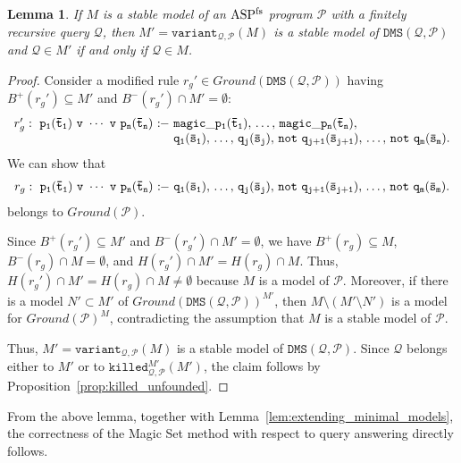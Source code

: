\documentclass{tlp}
\newcommand{\nop}[1]{}
\newcommand{\Or}{\ensuremath{\mathtt{\,v\,}}\xspace}
\newcommand{\derives}{\ensuremath{\mathtt{\ :\!\!-}\ }}
\newcommand{\p}{\ensuremath{{\mathcal{P}}}}
\newcommand{\R}{\ensuremath{r}}
\newcommand{\naf}{\ensuremath{\mathtt{not}}\xspace}
\newcommand{\ground}[1]{\ensuremath{Ground(#1)}}
\newcommand{\head}[1]{\ensuremath{H(#1)}}
\newcommand{\posbody}[1]{\ensuremath{B^+(#1)}}
\newcommand{\negbody}[1]{\ensuremath{B^-(#1)}}
\newenvironment{dlvcode}
  {\begin{displaymath}\begin{array}{l}}
  {\end{array}\end{displaymath}}
\newtheorem{lemma}[theorem]{Lemma}
\newcommand{\Q}{\mathcal{Q}}
\newcommand{\dmsqp}{\ensuremath{\DMS(\Q,\p)}}
\newcommand{\killed}[4]{\ensuremath{\mathtt{killed}^{#1}_{#3,#4}(#2)}}
\newcommand{\killedmpmp}{\ensuremath{\killed{M'}{M'}{\Q}{\p}}}
\newcommand{\variant}[3]{\ensuremath{\mathtt{variant}_{#1,#2}(#3)}}
\newcommand{\variantqpm}{\ensuremath{\variant{\Q}{\p}{M}}}
\newcommand{\DMS}{\ensuremath{\mathtt{DMS}}}
\renewcommand{\t}{\bar t}
\newcommand{\s}{\bar s}
\newcommand{\ASPFN}{\ensuremath{\rm ASP^{\rm fs}}}
\begin{document}
\begin{lemma}\label{lem:variant_stable_model} 
If $M$ is a stable model of an \ASPFN{} program $\p$ with a finitely recursive query $\Q$, then $M' = \variantqpm$ is a stable model of $\dmsqp$
and $\Q \in M'$ if and only if $\Q \in M$.
\end{lemma}
\begin{proof}
Consider a modified rule $\R_g' \in \ground{\dmsqp}$ having
$\posbody{\R_g'} \subseteq M'$ and $\negbody{\R_g'} \cap M' = \emptyset$:
\begin{dlvcode}
\R_g': \ \tt p_1(\t_1)\,\Or\,\cdots\,\Or\,p_n(\t_n) \derives 
     magic\_p_1(\t_1),\,\ldots,\,magic\_p_n(\t_n),\\
\phantom{\R_g': \ \tt p_1(\t_1)\,\Or\,\cdots\,\Or\,p_n(\t_n) \derives }
     \tt q_1(\s_1),\,\ldots,\,q_j(\s_j),\,\naf~q_{j+1}(\s_{j+1}),\,\ldots,\,\naf~q_m(\s_m).
\end{dlvcode}We can show that
\begin{dlvcode}
\R_g: \ \tt p_1(\t_1)\,\Or\,\cdots\,\Or\,p_n(\t_n) \derives 
    q_1(\s_1),\,\ldots,\,q_j(\s_j),\,\naf~q_{j+1}(\s_{j+1}),\,\ldots,\,\naf~q_m(\s_m).
\end{dlvcode}belongs to $\ground{\p}$. 
\nop{
\begin{proof}
By definition, $\R_g \in \ground{\dmsqp}$ if and only if there is $\R \in \p$ 
such that $\R_g = \R\vartheta$ for some substitution $\vartheta$.
Since ${\tt magic\_p_i(\t_i)} \in \ensuremath{B_{\dmsqp}}$, $\R \in \p$ and
$\R_g = \R\vartheta$
if and only if a modified rule $\R'$ such that $\R_g' = \R'\vartheta$ has been
produced.
\end{proof}
}
Since $\posbody{\R_g'} \subseteq M'$ and 
$\negbody{\R_g'} \cap M' = \emptyset$, we have 
$\posbody{\R_g} \subseteq M$, $\negbody{\R_g} \cap M = \emptyset$,
and $\head{\R_g'} \cap M' = \head{\R_g} \cap M$. 
Thus, $\head{\R_g'} \cap M' = \head{\R_g} \cap M \neq \emptyset$ because
$M$ is a model of $\p$.
Moreover, if there is a model $N' \subset M'$ of $\ground{\dmsqp}^{M'}$,
then $M \setminus (M' \setminus N')$ is a model for $\ground{\p}^M$,
contradicting the assumption that $M$ is a stable model of $\p$.

Thus, $M' = \variantqpm$ is a stable
model of $\dmsqp$.
Since $\Q$ belongs either to $M'$ or to $\killedmpmp$, 
the claim follows by Proposition~\ref{prop:killed_unfounded}.
\end{proof}

From the above lemma, together with Lemma~\ref{lem:extending_minimal_models}, the
correctness of the Magic Set method with respect to query answering directly follows.
\end{document}
